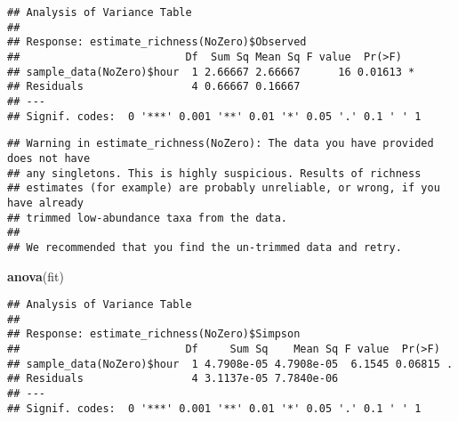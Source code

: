\documentclass[]{article}
\newenvironment{Shaded}{\begin{snugshade}}{\end{snugshade}}
\newcommand{\KeywordTok}[1]{\textcolor[rgb]{0.13,0.29,0.53}{\textbf{#1}}}
\newcommand{\StringTok}[1]{\textcolor[rgb]{0.31,0.60,0.02}{#1}}
\newcommand{\CommentTok}[1]{\textcolor[rgb]{0.56,0.35,0.01}{\textit{#1}}}
\newcommand{\OperatorTok}[1]{\textcolor[rgb]{0.81,0.36,0.00}{\textbf{#1}}}
\newcommand{\NormalTok}[1]{#1}
\begin{document}
\begin{verbatim}
## Analysis of Variance Table
## 
## Response: estimate_richness(NoZero)$Observed
##                          Df  Sum Sq Mean Sq F value  Pr(>F)  
## sample_data(NoZero)$hour  1 2.66667 2.66667      16 0.01613 *
## Residuals                 4 0.66667 0.16667                  
## ---
## Signif. codes:  0 '***' 0.001 '**' 0.01 '*' 0.05 '.' 0.1 ' ' 1
\end{verbatim}

\begin{Shaded}
\end{Shaded}

\begin{verbatim}
## Warning in estimate_richness(NoZero): The data you have provided does not have
## any singletons. This is highly suspicious. Results of richness
## estimates (for example) are probably unreliable, or wrong, if you have already
## trimmed low-abundance taxa from the data.
## 
## We recommended that you find the un-trimmed data and retry.
\end{verbatim}

\begin{Shaded}
\begin{Highlighting}[]
\KeywordTok{anova}\NormalTok{(fit)}
\end{Highlighting}
\end{Shaded}

\begin{verbatim}
## Analysis of Variance Table
## 
## Response: estimate_richness(NoZero)$Simpson
##                          Df     Sum Sq    Mean Sq F value  Pr(>F)  
## sample_data(NoZero)$hour  1 4.7908e-05 4.7908e-05  6.1545 0.06815 .
## Residuals                 4 3.1137e-05 7.7840e-06                  
## ---
## Signif. codes:  0 '***' 0.001 '**' 0.01 '*' 0.05 '.' 0.1 ' ' 1
\end{verbatim}
\end{document}
